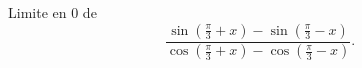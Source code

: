 Limite en $0$ de 
\[
 \frac{\sin(\frac{\pi}{3} + x) - \sin(\frac{\pi}{3} - x)}{\cos(\frac{\pi}{3} + x) - \cos(\frac{\pi}{3} - x)}.
\]
\bigskip